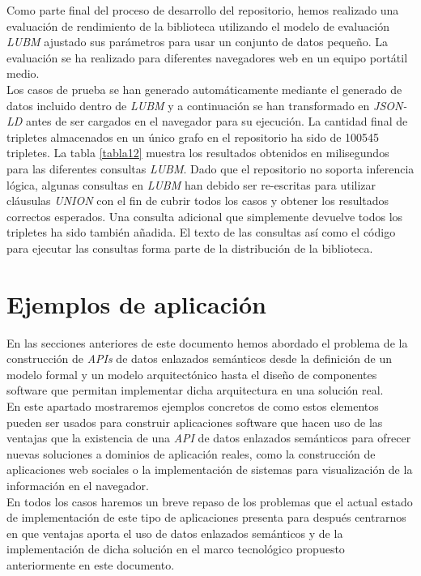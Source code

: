 Como parte final del proceso de desarrollo del repositorio, hemos realizado una evaluaci\'on de rendimiento de la biblioteca utilizando el modelo de evaluaci\'on \textit{LUBM} \cite{lubm} ajustado sus par\'ametros para usar un conjunto de datos peque\~no. La evaluaci\'on se ha realizado para diferentes navegadores web en un equipo port\'atil medio.\\
Los casos de prueba se han generado autom\'aticamente mediante el generado de datos incluido dentro de \textit{LUBM} y a continuaci\'on se han transformado en \textit{JSON-LD} antes de ser cargados en el navegador para su ejecuci\'on. La cantidad final de tripletes almacenados en un \'unico grafo en el repositorio ha sido de 100545 tripletes. La tabla \ref{tabla12} muestra los resultados obtenidos en milisegundos para las diferentes consultas \textit{LUBM}. Dado que el repositorio no soporta inferencia l\'ogica, algunas consultas en \textit{LUBM} han debido ser re-escritas para utilizar cl\'ausulas \textit{UNION} con el fin de cubrir todos los casos y obtener los resultados correctos esperados. Una consulta adicional que simplemente devuelve todos los tripletes ha sido tambi\'en a\~nadida. El texto de las consultas as\'i como el c\'odigo para ejecutar las consultas forma parte de la distribuci\'on de la biblioteca.

\section{Ejemplos de aplicaci\'on}

En las secciones anteriores de este documento hemos abordado el problema de la construcci\'on de \textit{APIs} de datos enlazados sem\'anticos desde la definici\'on de un modelo formal y un modelo arquitect\'onico hasta el dise\~no de componentes software que permitan implementar dicha arquitectura en una soluci\'on real.\\
En este apartado mostraremos ejemplos concretos de como estos elementos pueden ser usados para construir aplicaciones software que hacen uso de las ventajas que la existencia de una \textit{API} de datos enlazados sem\'anticos para ofrecer nuevas soluciones a dominios de aplicaci\'on reales, como la construcci\'on de aplicaciones web sociales o la implementaci\'on de sistemas para visualizaci\'on de la informaci\'on en el navegador.\\
En todos los casos haremos un breve repaso de los problemas que el actual estado de implementaci\'on de este tipo de aplicaciones presenta para despu\'es centrarnos en que ventajas aporta el uso de datos enlazados sem\'anticos y de la implementaci\'on de dicha soluci\'on en el marco tecnol\'ogico propuesto anteriormente en este documento.

